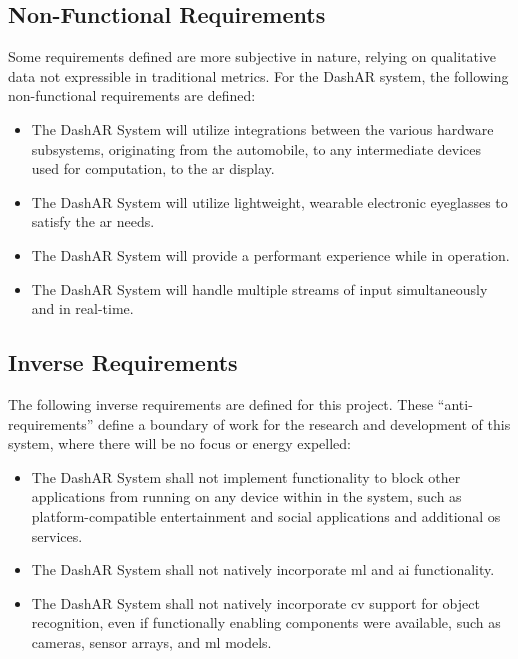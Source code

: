     \subsection{Non-Functional Requirements}
        \par Some requirements defined are more subjective in nature, relying on qualitative data not expressible in traditional metrics. For the DashAR system, the following non-functional requirements are defined:

        \begin{itemize}
            \item The DashAR System will utilize integrations between the various hardware subsystems, originating from the automobile, to any intermediate devices used for computation, to the \gls{ar} display.
            \item The DashAR System will utilize lightweight, wearable electronic eyeglasses to satisfy the \gls{ar} needs.
            \item The DashAR System will provide a performant experience while in operation.
            \item The DashAR System will handle multiple streams of input simultaneously and in real-time.
        \end{itemize}

    \subsection{Inverse Requirements}
        \par The following inverse requirements are defined for this project. These ``anti-requirements'' define a boundary of work for the research and development of this system, where there will be no focus or energy expelled:

        \begin{itemize}
            \item The DashAR System shall not implement functionality to block other applications from running on any device within in the system, such as platform-compatible entertainment and social applications and additional \gls{os} services.
            \item The DashAR System shall not natively incorporate \gls{ml} and \gls{ai} functionality.
            \item The DashAR System shall not natively incorporate \gls{cv} support for object recognition, even if functionally enabling components were available, such as cameras, sensor arrays, and \gls{ml} models.
        \end{itemize}

